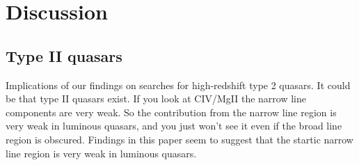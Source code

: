 \section{Discussion}

\subsection{Type II quasars}

Implications of our findings on searches for high-redshift type 2 quasars. It could be that type II quasars exist. If you look at CIV/MgII the narrow line components are very weak. So the contribution from the narrow line region is very weak in luminous quasars, and you just won't see it even if the broad line region is obscured.
Findings in this paper seem to suggest that the startic narrow line region is very weak in luminous quasars. 